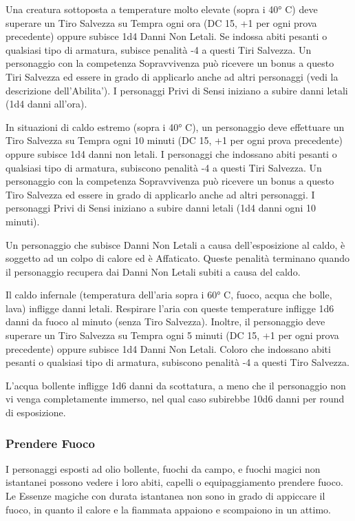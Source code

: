 \documentclass[a4paper,11pt,twoside,openany]{book}
\begin{document}
\label{pericoli-del-caldo}

Una creatura sottoposta a temperature molto elevate (sopra i 40° C) deve superare un Tiro Salvezza su Tempra ogni ora (DC 15, +1 per ogni prova precedente) oppure subisce 1d4 Danni Non Letali. Se indossa abiti pesanti o qualsiasi tipo di armatura, subisce penalità -4 a questi Tiri Salvezza. Un personaggio con la competenza Sopravvivenza può ricevere un bonus a questo Tiri Salvezza ed essere in grado di applicarlo anche ad altri personaggi (vedi la descrizione dell'Abilita'). I personaggi Privi di Sensi iniziano a subire danni letali (1d4 danni all'ora).

In situazioni di caldo estremo (sopra i 40° C), un personaggio deve effettuare un Tiro Salvezza su Tempra ogni 10 minuti (DC 15, +1 per ogni prova precedente) oppure subisce 1d4 danni non letali. I personaggi che indossano abiti pesanti o qualsiasi tipo di armatura, subiscono penalità -4 a questi Tiri Salvezza. Un personaggio con la competenza Sopravvivenza può ricevere un bonus a questo Tiro Salvezza ed essere in grado di applicarlo anche ad altri personaggi. I personaggi Privi di Sensi iniziano a subire danni letali (1d4 danni ogni 10 minuti).

Un personaggio che subisce Danni Non Letali a causa dell'esposizione al caldo, è soggetto ad un colpo di calore ed è Affaticato. Queste penalità terminano quando il personaggio recupera dai Danni Non Letali subiti a causa del caldo.

Il caldo infernale (temperatura dell'aria sopra i 60° C, fuoco, acqua che bolle, lava) infligge danni letali. Respirare l'aria con queste temperature infligge 1d6 danni da fuoco al minuto (senza Tiro Salvezza).
Inoltre, il personaggio deve superare un Tiro Salvezza su Tempra ogni 5 minuti (DC 15, +1 per ogni prova precedente) oppure subisce 1d4 Danni Non Letali. Coloro che indossano abiti pesanti o qualsiasi tipo di armatura, subiscono penalità -4 a questi Tiro Salvezza.

L'acqua bollente infligge 1d6 danni da scottatura, a meno che il personaggio non vi venga completamente immerso, nel qual caso subirebbe 10d6 danni per round di esposizione.

\subsubsection{Prendere Fuoco}

\label{prendere-fuoco}

I personaggi esposti ad olio bollente, fuochi da campo, e fuochi magici non istantanei possono vedere i loro abiti, capelli o equipaggiamento prendere fuoco. Le Essenze magiche con durata istantanea non sono in grado di appiccare il fuoco, in quanto il calore e la fiammata appaiono e scompaiono in un attimo.
\end{document}
